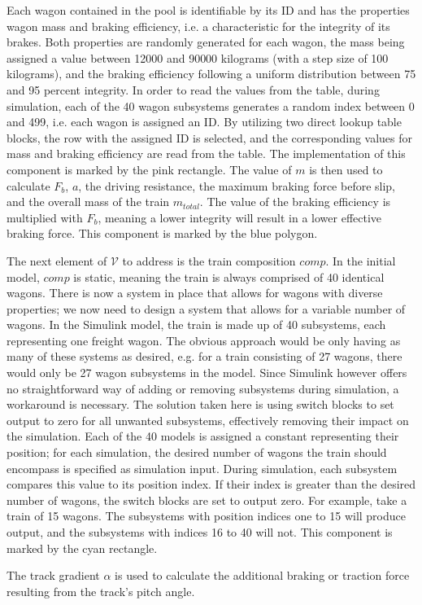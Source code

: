 \noindent
Each wagon contained in the pool is identifiable by its ID and has the properties wagon mass and braking efficiency, i.e. a characteristic for the integrity of its brakes. Both properties are randomly generated for each wagon, the mass being assigned a value between 12000 and 90000 kilograms (with a step size of 100 kilograms), and the braking efficiency following a uniform distribution between 75 and 95 percent integrity. In order to read the values from the table, during simulation, each of the 40 wagon subsystems generates a random index between 0 and 499, i.e. each wagon is assigned an ID. By utilizing two direct lookup table blocks, the row with the assigned ID is selected, and the corresponding values for mass and braking efficiency are read from the table. The implementation of this component is marked by the pink rectangle. The value of $m$ is then used to calculate $F_{b}$, $a$, the driving resistance, the maximum braking force before slip, and the overall mass of the train $m_{total}$. The value of the braking efficiency is multiplied with $F_{b}$, meaning a lower integrity will result in a lower effective braking force. This component is marked by the blue polygon.
\par
The next element of ${\mathcal{V}}$ to address is the train composition $comp$. In the initial model, $comp$ is static, meaning the train is always comprised of 40 identical wagons. There is now a system in place that allows for wagons with diverse properties; we now need to design a system that allows for a variable number of wagons. In the Simulink model, the train is made up of 40 subsystems, each representing one freight wagon. The obvious approach would be only having as many of these systems as desired, e.g. for a train consisting of 27 wagons, there would only be 27 wagon subsystems in the model. Since Simulink however offers no straightforward way of adding or removing subsystems during simulation, a workaround is necessary. The solution taken here is using switch blocks to set output to zero for all unwanted subsystems, effectively removing their impact on the simulation. Each of the 40 models is assigned a constant representing their position; for each simulation, the desired number of wagons the train should encompass is specified as simulation input. During simulation, each subsystem compares this value to its position index. If their index is greater than the desired number of wagons, the switch blocks are set to output zero. For example, take a train of 15 wagons. The subsystems with position indices one to 15 will produce output, and the subsystems with indices 16 to 40 will not. This component is marked by the cyan rectangle.
\par
The track gradient $\alpha$ is used to calculate the additional braking or traction force resulting from the track's pitch angle. 

